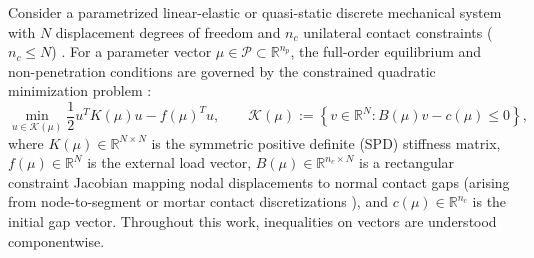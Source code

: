 \documentclass[11pt,a4paper]{article}
\begin{document}
Consider a parametrized linear-elastic or quasi-static discrete mechanical system with \(N\) displacement degrees of freedom and \(n_c\) unilateral contact constraints (\(n_c \le N\)) \cite{kikuchi1988contact, coorevits2000posteriori, hild2007residual}. For a parameter vector \(\mu \in \mathcal{P} \subset \mathbb{R}^{n_p}\), the full-order equilibrium and non-penetration conditions are governed by the constrained quadratic minimization problem \cite{balajewicz2016projection, benaceur2020reduced}:
\begin{equation}\label{eq:primal}\min_{u \in \mathcal{K}(\mu)} \frac{1}{2} u^T K(\mu) u - f(\mu)^T u, \qquad \mathcal{K}(\mu) := \left\{ v \in \mathbb{R}^N : B(\mu) v - c(\mu) \le 0 \right\},\end{equation}
where \(K(\mu) \in \mathbb{R}^{N \times N}\) is the symmetric positive definite (SPD) stiffness matrix, \(f(\mu) \in \mathbb{R}^N\) is the external load vector, \(B(\mu) \in \mathbb{R}^{n_c \times N}\) is a rectangular constraint Jacobian mapping nodal displacements to normal contact gaps (arising from node-to-segment or mortar contact discretizations \cite{coorevits2000posteriori, wohlmuth2000mortar, wohlmuth2011variationally, hild2010stabilized, franceschini2022block}), and \(c(\mu) \in \mathbb{R}^{n_c}\) is the initial gap vector. Throughout this work, inequalities on vectors are understood componentwise.
\end{document}
